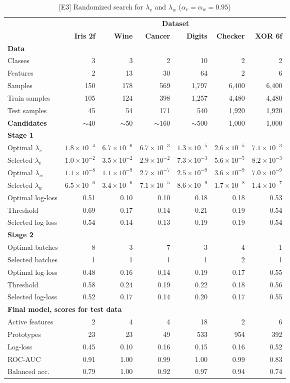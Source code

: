 %
\begin{table}
\caption{[E3] Randomized search for $\lambda_v$ and $\lambda_w$ ($\alpha_v=\alpha_w=0.95$)}
\label{tab_e3}
%
\begin{center}
\small
\begin{tabular}{|lrrrrrr|}
\hline
&\multicolumn{6}{c|}{\textbf{\hrulefill\ Dataset \hrulefill}}\\
&\textbf{Iris 2f}&\textbf{Wine}&\textbf{Cancer}&\textbf{Digits}&\textbf{Checker}&\textbf{XOR 6f}\\
\multicolumn{7}{|l|}{\textbf{Data}}\\
Classes&3&3&2&10&2&2\\
Features&2&13&30&64&2&6\\
Samples&150&178&569&1,797&6,400&6,400\\
Train samples&105&124&398&1,257&4,480&4,480\\
Test samples&45&54&171&540&1,920&1,920\\
\textbf{Candidates}&$\sim40$&$\sim50$&$\sim160$&$\sim500$&1,000&1,000\\
\multicolumn{7}{|l|}{\textbf{Stage 1}}\\
Optimal $\lambda_v$&$1.8\times10^{-4}$&$6.7\times10^{-6}$&$6.7\times10^{-3}$&$1.3\times10^{-5}$&$2.6\times10^{-5}$&$7.1\times10^{-3}$\\
Selected $\lambda_v$&$1.0\times10^{-2}$&$3.5\times10^{-2}$&$2.9\times10^{-2}$&$7.3\times10^{-3}$&$5.6\times10^{-5}$&$8.2\times10^{-3}$\\
Optimal $\lambda_w$&$1.1\times10^{-8}$&$1.1\times10^{-9}$&$2.7\times10^{-7}$&$2.5\times10^{-9}$&$3.6\times10^{-9}$&$7.0\times10^{-9}$\\
Selected $\lambda_w$&$6.5\times10^{-6}$&$3.4\times10^{-6}$&$7.1\times10^{-5}$&$8.6\times10^{-9}$&$1.7\times10^{-8}$&$1.4\times10^{-7}$\\
Optimal log-loss&0.51&0.10&0.10&0.18&0.18&0.53\\
Threshold&0.69&0.17&0.14&0.21&0.19&0.54\\
Selected log-loss&0.54&0.14&0.13&0.19&0.19&0.54\\
\multicolumn{7}{|l|}{\textbf{Stage 2}}\\
Optimal batches&8&3&7&3&4&1\\
Selected batches&1&1&1&1&2&1\\
Optimal log-loss&0.48&0.16&0.14&0.19&0.17&0.55\\
Threshold&0.58&0.24&0.19&0.22&0.18&0.56\\
Selected log-loss&0.52&0.17&0.14&0.20&0.17&0.55\\
\multicolumn{7}{|l|}{\textbf{Final model, scores for test data}}\\
Active features&2&4&4&18&2&6\\
Prototypes&23&23&49&533&954&392\\
Log-loss&0.45&0.10&0.16&0.15&0.16&0.52\\
ROC-AUC&0.91&1.00&0.99&1.00&0.99&0.83\\
Balanced acc.&0.79&1.00&0.92&0.97&0.94&0.74\\
\hline
\end{tabular}
\end{center}
\end{table}
